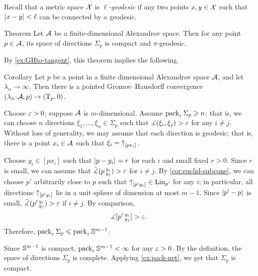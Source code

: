 Recall that a metric space $\mathcal{X}$ is \emph{$\ell$-geodesic}
if any two points $x,y\in\mathcal{X}$ such that $|{x}-{y}|_{}^{{}}<\ell$ can be connected by a geodesic.

\begin{thm}{Theorem}\label{thm:finite-space-of-directions}
Let $\mathcal{A}$ be a finite-dimensional Alexandrov space.
Then for any point $p\in \mathcal{A}$, its space of directions $\Sigma_p$ is compact and $\pi$-geodesic.
\end{thm}

By \ref{ex:GHto-tangent}, this theorem implies the following.

\begin{thm}{Corollary}\label{ex:GHto-tangent-finite-dim}
Let $p$ be a point in a finite dimensional Alexandrov space $\mathcal{A}$,
and let $\lambda_n\to\infty$.
Then there is a pointed Gromov--Hausdorff convergence $(\lambda_n\cdot \spc{A},p)\z\to (\T_p,0)$.
\end{thm}

Choose $\varepsilon>0$; suppose $\mathcal{A}$ is $m$-dimensional.
Assume $\operatorname{\rm pack}\nolimits_\varepsilon \Sigma_p\geqslant n$;
that is, we can choose $n$ directions $\xi_1,\dots, \xi_n\in \Sigma_p$ such that $\measuredangle(\xi_i,\xi_j)>\varepsilon$ for any $i\ne j$.
Without loss of generality, we may assume that each direction is geodesic;
that is, there is a point $x_i\in \mathcal{A}$ such that $\xi_i={\uparrow}_{[{p}{x_i}]_{{}}}$.

Choose $y_i\in [px_i]$ such that $|{p}-{y_i}|_{}^{{}}=r$ for each $i$ and small fixed $r>0$.
Since $r$ is small, we can assume that $\tilde\measuredangle(p\,{}^{y_i}_{y_j})>\varepsilon$ for $i\ne j$.
By \ref{cor:euclid-subcone}, we can choose $p'$ arbitrarily close to $p$ such that ${\uparrow}_{[{p'}{y_i}]_{{}}}\in \mathop{\rm Lin}\nolimits_{p'}$ for any $i$;
in particular, all directions ${\uparrow}_{[{p'}{y_i}]_{{}}}$ lie in a unit sphere of dimension at most $m-1$.
Since  $|{p'}-{p}|_{}^{{}}$ is small, $\tilde\measuredangle(p'\,{}^{y_i}_{y_j})>\varepsilon$ if $i\ne j$.
By comparison, 
\[\measuredangle [p'\,{}^{y_i}_{y_j}]>\varepsilon.\]
Therefore, $\operatorname{\rm pack}\nolimits_\varepsilon \Sigma_p\leqslant \operatorname{\rm pack}\nolimits_\varepsilon\mathbb{S}^{m-1}$.

Since $\mathbb{S}^{m-1}$ is compact, $\operatorname{\rm pack}\nolimits_\varepsilon\mathbb{S}^{m-1}<\infty$ for any $\varepsilon>0$.
By the definition, the space of directions $\Sigma_p$ is complete. 
Applying \ref{ex:pack-net}, we get that  $\Sigma_p$ is compact.

